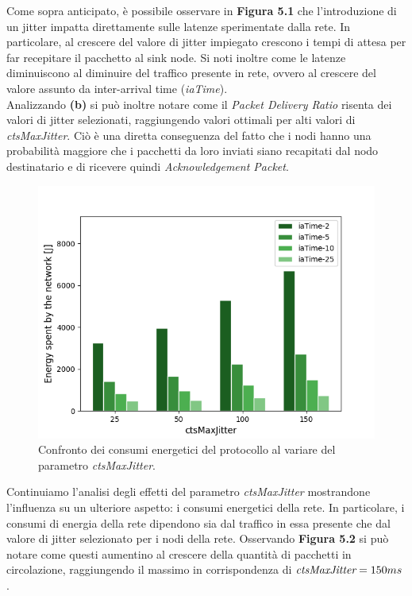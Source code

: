 \documentclass[binding=0.6cm,TFA]{sapthesis}
\begin{document}
Come sopra anticipato, è possibile osservare in \textbf{Figura 5.1} che l'introduzione di un jitter impatta direttamente sulle latenze sperimentate dalla rete.
In particolare, al crescere del valore di jitter impiegato crescono i tempi di attesa per far recepitare il pacchetto al sink node. Si noti inoltre come le latenze
diminuiscono al diminuire del traffico presente in rete, ovvero al crescere del valore assunto da inter-arrival time (\emph{iaTime}).\\

Analizzando \textbf{(b)} si può inoltre notare come il \emph{Packet Delivery Ratio} risenta dei valori di jitter selezionati, raggiungendo valori ottimali per
alti valori di \emph{ctsMaxJitter}. Ciò è una diretta conseguenza del fatto che i nodi hanno una probabilità maggiore che i pacchetti da loro inviati siano
recapitati dal nodo destinatario e di ricevere quindi \emph{Acknowledgement Packet}.

\begin{figure}
    \begin{center}
        \includegraphics[scale=0.5]{energy_jitter_comparison_plot.png}
        \caption{Confronto dei consumi energetici del protocollo al variare del parametro \emph{ctsMaxJitter}.}
    \end{center}
\end{figure}

Continuiamo l'analisi degli effetti del parametro \emph{ctsMaxJitter} mostrandone l'influenza su un ulteriore aspetto: i consumi energetici della rete. In
particolare, i consumi di energia della rete dipendono sia dal traffico in essa presente che dal valore di jitter selezionato per i nodi della rete. Osservando
\textbf{Figura 5.2} si può notare come questi aumentino al crescere della quantità di pacchetti in circolazione, raggiungendo il massimo in corrispondenza
di $\emph{ctsMaxJitter}=150ms$.\\
\end{document}
